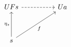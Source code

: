 \[\begin{tikzcd}
	UFs && Ua \\
	\\
	s
	\arrow["{\eta_{s}}", from=3-1, to=1-1]
	\arrow[dashed, from=1-1, to=1-3]
	\arrow["f"', from=3-1, to=1-3]
\end{tikzcd}\]